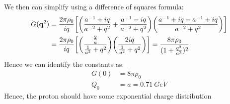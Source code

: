 \documentclass[12pt]{article}
\begin{document}
We then can simplify using a difference of squares formula:
\begin{align*}
  G(\vb{q}^2)&=\frac{2\pi\rho_0}{iq}
  \qty[\qty(\frac{a^{-1}+iq}{a^{-2}+q^2}+\frac{a^{-1}-iq}{a^{-2}+q^2})
  \qty(\frac{a^{-1}+iq-a^{-1}+iq}{a^{-2}+q^2})]\\
  &=\frac{2\pi\rho_0}{iq}\qty[\qty(\frac{\frac2a}{\frac1{a^2}+q^2})
  \qty(\frac{2iq}{\frac1{a^2}+q^2})]=\frac{8\pi\rho_0}{(1+\frac{q^2}{a^2})^2}
\end{align*}
Hence we can identify the constants as:
\begin{equation}
  \label{eq:p3}
  \boxed{
    \begin{aligned}
      G(0)&=8\pi\rho_0\\
      Q_0&=a=\SI{0.71}{GeV}
    \end{aligned}
  }
\end{equation}
Hence, the proton should have some exponential charge distribution
\newpage
\end{document}
